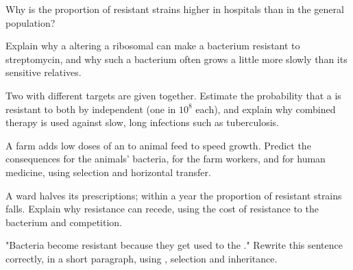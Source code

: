 \begin{exercise}[$\star\star$]\label{exo:g11:antibiotic-resistance:10}
Why is the proportion of resistant strains higher in hospitals than
in the general population?
\end{exercise}

\begin{exercise}[$\star\star$]\label{exo:g11:antibiotic-resistance:11}
Explain why a  altering a ribosomal  can make a
bacterium resistant to streptomycin, and why such a bacterium often
grows a little more slowly than its sensitive relatives.
\end{exercise}

\begin{exercise}[$\star\star\star$]\label{exo:g11:antibiotic-resistance:12}
Two  with different targets are given together. Estimate
the probability that a  is resistant to both by independent
 (one in $10^8$ each), and explain why combined therapy is
used against slow, long infections such as tuberculosis.
\end{exercise}

\begin{exercise}[$\star\star\star$]\label{exo:g11:antibiotic-resistance:13}
A farm adds low doses of an  to animal feed to speed
growth. Predict the consequences for the animals' bacteria, for the
farm workers, and for human medicine, using selection and horizontal
transfer.
\end{exercise}

\begin{exercise}[$\star\star\star$]\label{exo:g11:antibiotic-resistance:14}
A ward halves its  prescriptions; within a year the
proportion of resistant strains falls. Explain why resistance can
recede, using the cost of resistance to the bacterium and
competition.
\end{exercise}

\begin{exercise}[$\star\star\star$]\label{exo:g11:antibiotic-resistance:15}
"Bacteria become resistant because they get used to the ."
Rewrite this sentence correctly, in a short paragraph, using
, selection and inheritance.
\end{exercise}


